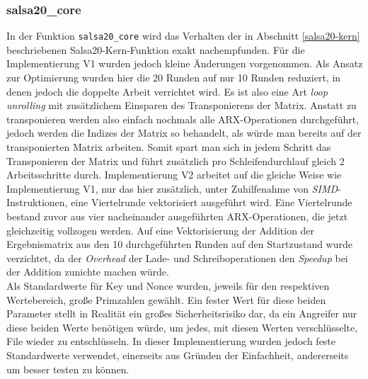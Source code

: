 \documentclass[course=erap]{aspdoc}
\begin{document}
\subsubsection{salsa20\_core} \label{core}
In der Funktion \texttt{salsa20\_core} wird das Verhalten der in Abschnitt \ref{salsa20-kern} beschriebenen Salsa20-Kern-Funktion exakt nachempfunden. Für die Implementierung V1 wurden jedoch kleine Änderungen vorgenommen.
Als Ansatz zur Optimierung wurden hier die 20 Runden auf nur 10 Runden reduziert, in denen jedoch die doppelte Arbeit verrichtet wird. Es ist also eine Art \emph{loop unrolling} mit zusätzlichem Einsparen des 
Transponierens der Matrix. Anstatt zu transponieren werden also einfach nochmals alle ARX-Operationen durchgeführt, jedoch werden die Indizes der Matrix so behandelt, als würde man bereits auf
der transponierten Matrix arbeiten. Somit spart man sich in jedem Schritt das Transponieren der Matrix und führt zusätzlich pro Schleifendurchlauf gleich 2 Arbeitsschritte durch. Implementierung V2
arbeitet auf die gleiche Weise wie Implementierung V1, nur das hier zusätzlich, unter Zuhilfenahme von \emph{SIMD}-Instruktionen, eine Viertelrunde vektorisiert ausgeführt wird. Eine Viertelrunde bestand zuvor 
aus vier nacheinander ausgeführten ARX-Operationen, die jetzt gleichzeitig vollzogen werden. Auf eine Vektorisierung der Addition der Ergebnismatrix aus den 10 durchgeführten Runden auf den Startzustand wurde verzichtet,
da der \emph{Overhead} der Lade- und Schreiboperationen den \emph{Speedup} bei der Addition zunichte machen würde.
\\Als Standardwerte für Key und Nonce wurden, jeweils für den respektiven Wertebereich, große Primzahlen gewählt. Ein fester Wert für diese beiden Parameter stellt in Realität ein großes Sicherheitsrisiko dar, 
da ein Angreifer nur diese beiden Werte benötigen würde, um jedes, mit diesen Werten verschlüsselte, File wieder zu entschlüsseln. In dieser Implementierung wurden jedoch feste Standardwerte verwendet, einerseits aus Gründen
der Einfachheit, andererseits um besser testen zu können. 
\end{document}
